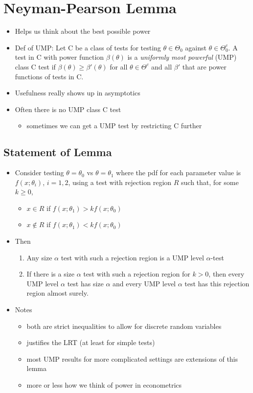 \section{Neyman-Pearson Lemma}

\begin{itemize}[leftmargin=0pt]
\item Helps us think about the best possible power
\item Def of UMP: Let C be a class of tests for testing $\theta \in \Theta_0$
  against $\theta \in \Theta_0^c$.  A test in C with power function $\beta(\theta)$ is a
  \emph{uniformly most powerful} (UMP) class C test if $\beta(\theta) \geq \beta'(\theta)$
  for all $\theta \in \Theta^c$ and all $\beta'$ that are power functions of tests in
  C.
\item Usefulness really shows up in asymptotics
\item Often there is no UMP class C test
\begin{itemize}
\item sometimes we can get a UMP test by restricting C further
\end{itemize}
\end{itemize}

\subsection{Statement of Lemma}

\begin{itemize}
\item Consider testing $\theta = \theta_0$ vs $\theta = \theta_1$ where the pdf for each
  parameter value is $f(x; \theta_i)$, $i = 1,2$, using a test with
  rejection region $R$ such that, for some $k \geq 0$,
\begin{itemize}
\item $x \in R$ if $f(x; \theta_1) > k f(x; \theta_0)$
\item $x \notin R$ if $f(x; \theta_1) < k f(x; \theta_0)$
\end{itemize}
\item Then
\begin{enumerate}
\item Any size $\alpha$ test with such a rejection region is a UMP level $\alpha$-test
\item If there is a size $\alpha$ test with such a rejection region for $k
  > 0$, then every UMP level $\alpha$ test has size $\alpha$ and every UMP level
  $\alpha$ test has this rejection region almost surely.
\end{enumerate}
\item Notes
\begin{itemize}
\item both are strict inequalities to allow for discrete random
         variables
\item justifies the LRT (at least for simple tests)
\item most UMP results for more complicated settings are extensions
         of this lemma
\item more or less how we think of power in econometrics
\end{itemize}
\end{itemize}

